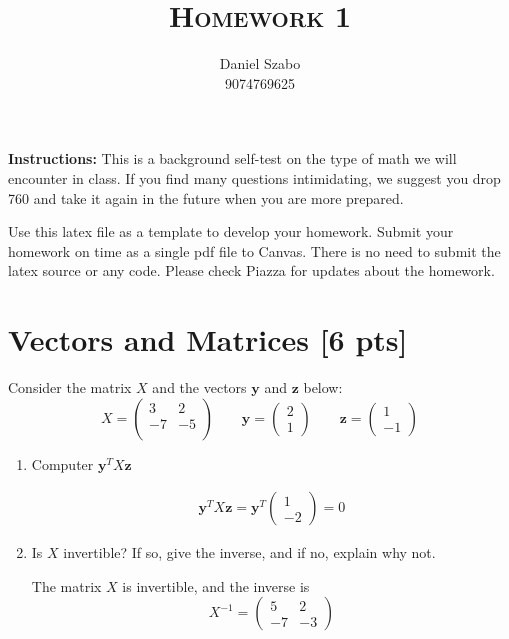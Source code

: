 \documentclass[a4paper]{article}
\title{\textsc{Homework 1}} %
\author{
	Daniel Szabo \\
	9074769625\\
}
\date{}
\theoremstyle{definition}
\newenvironment{soln}{
	\leavevmode\color{blue}\ignorespaces
}{}
\begin{document}
	
	\maketitle 
	
	
	\textbf{Instructions:} 
	This is a background self-test on the type of math we will encounter in class. If you find many questions intimidating, we suggest you drop 760 and take it again in the future when you are more prepared.
	
	Use this latex file as a template to develop your homework.
	Submit your homework on time as a single pdf file to Canvas.
	There is no need to submit the latex source or any code.
	Please check Piazza for updates about the homework.
	
	
	\section{Vectors and Matrices [6 pts]}
	Consider the matrix $X$ and the vectors $\mathbf{y}$ and $\textbf{z}$ below:
	$$
	X = \begin{pmatrix}
		3 & 2 \\ -7 & -5 \\
	\end{pmatrix}
	\qquad \mathbf{y} = \begin{pmatrix}
		2 \\ 1
	\end{pmatrix} \qquad \mathbf{z} = \begin{pmatrix}
		1 \\ -1
	\end{pmatrix}
	$$
	\begin{enumerate}
		\item 	Computer $\mathbf{y}^{T} X \mathbf{z}$\\
		\begin{soln} 
    	\begin{align*}
    		\mathbf{y}^{T} X \mathbf{z} = \mathbf{y}^T \begin{pmatrix}
    			1 \\ -2
    		\end{pmatrix} = 0
		\end{align*}
		     \end{soln}
		\item 	Is $X$ invertible? If so, give the inverse, and if no, explain why not.\\
        \begin{soln}
       	  The matrix $ X $ is invertible, and the inverse is 
       	  \[ X^{-1} = \begin{pmatrix}
       	  	5 & 2 \\ -7 & -3
       	  \end{pmatrix} \]
      	\end{soln}
	\end{enumerate}
	
\end{document}
